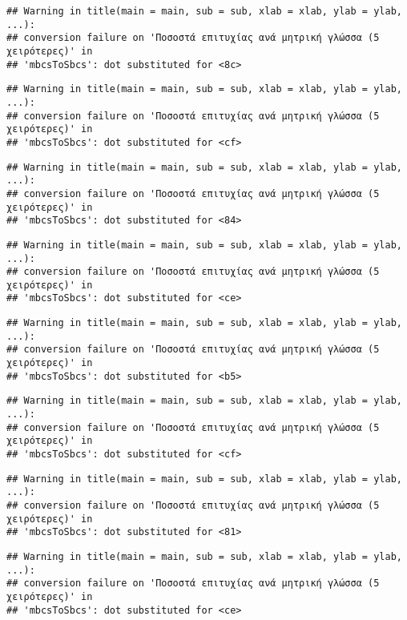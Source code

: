 \documentclass[
]{article}
\begin{document}
\begin{verbatim}
## Warning in title(main = main, sub = sub, xlab = xlab, ylab = ylab, ...):
## conversion failure on 'Ποσοστά επιτυχίας ανά μητρική γλώσσα (5 χειρότερες)' in
## 'mbcsToSbcs': dot substituted for <8c>
\end{verbatim}

\begin{verbatim}
## Warning in title(main = main, sub = sub, xlab = xlab, ylab = ylab, ...):
## conversion failure on 'Ποσοστά επιτυχίας ανά μητρική γλώσσα (5 χειρότερες)' in
## 'mbcsToSbcs': dot substituted for <cf>
\end{verbatim}

\begin{verbatim}
## Warning in title(main = main, sub = sub, xlab = xlab, ylab = ylab, ...):
## conversion failure on 'Ποσοστά επιτυχίας ανά μητρική γλώσσα (5 χειρότερες)' in
## 'mbcsToSbcs': dot substituted for <84>
\end{verbatim}

\begin{verbatim}
## Warning in title(main = main, sub = sub, xlab = xlab, ylab = ylab, ...):
## conversion failure on 'Ποσοστά επιτυχίας ανά μητρική γλώσσα (5 χειρότερες)' in
## 'mbcsToSbcs': dot substituted for <ce>
\end{verbatim}

\begin{verbatim}
## Warning in title(main = main, sub = sub, xlab = xlab, ylab = ylab, ...):
## conversion failure on 'Ποσοστά επιτυχίας ανά μητρική γλώσσα (5 χειρότερες)' in
## 'mbcsToSbcs': dot substituted for <b5>
\end{verbatim}

\begin{verbatim}
## Warning in title(main = main, sub = sub, xlab = xlab, ylab = ylab, ...):
## conversion failure on 'Ποσοστά επιτυχίας ανά μητρική γλώσσα (5 χειρότερες)' in
## 'mbcsToSbcs': dot substituted for <cf>
\end{verbatim}

\begin{verbatim}
## Warning in title(main = main, sub = sub, xlab = xlab, ylab = ylab, ...):
## conversion failure on 'Ποσοστά επιτυχίας ανά μητρική γλώσσα (5 χειρότερες)' in
## 'mbcsToSbcs': dot substituted for <81>
\end{verbatim}

\begin{verbatim}
## Warning in title(main = main, sub = sub, xlab = xlab, ylab = ylab, ...):
## conversion failure on 'Ποσοστά επιτυχίας ανά μητρική γλώσσα (5 χειρότερες)' in
## 'mbcsToSbcs': dot substituted for <ce>
\end{verbatim}
\end{document}
